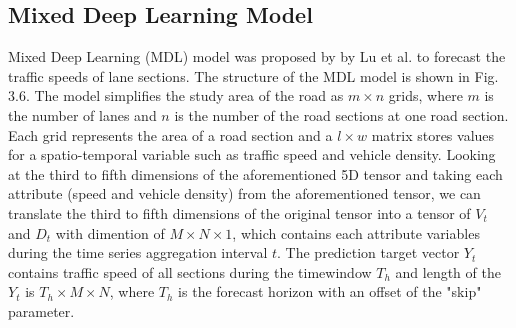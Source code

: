 \documentclass[11pt]{uonthesis}
\begin{document}
\subsection{Mixed Deep Learning Model}

Mixed Deep Learning (MDL) model was proposed by by Lu et al.\cite{9284587} to forecast the traffic speeds of lane sections. The structure of the MDL model is shown in Fig. 3.6. The model simplifies the study area of the road as $m{\times}n$ grids, where $m$ is the number of lanes and $n$ is the number of the road sections at one road section. Each grid represents the area of a road section and a $l{\times}w$ matrix stores values for a spatio-temporal variable such as traffic speed and vehicle density. Looking at the third to fifth dimensions of the aforementioned 5D tensor and taking each attribute (speed and vehicle density) from the aforementioned tensor, we can translate the third to fifth dimensions of the original tensor into a tensor of ${V_t}$ and ${D_t}$ with dimention of $M{\times}N{\times}1$, which contains each attribute variables during the time series aggregation interval $t$. The prediction target vector $Y_t$ contains traffic speed of all sections during the timewindow $T_h$ and length of the $Y_t$ is $T_h{\times}M{\times}N$, where $T_h$ is the forecast horizon with an offset of the "skip" parameter. %
\end{document}
